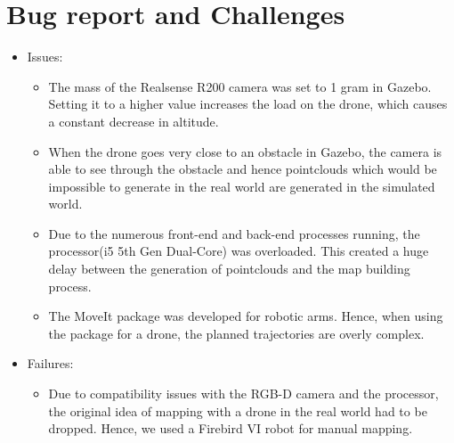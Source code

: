 \documentclass[a4paper,12pt,oneside]{book}
\begin{document}
\section{Bug report and Challenges}
\begin{itemize}
	\item Issues:
		\begin{itemize}
			\item The mass of the Realsense R200 camera was set to 1 gram in Gazebo. Setting it to a higher value increases the load on the drone, which causes a constant decrease in altitude.
			\item When the drone goes very close to an obstacle in Gazebo, the camera is able to see through the obstacle and hence pointclouds which would be impossible to generate in the real world are generated in the simulated world.
			\item Due to the numerous front-end and back-end processes running, the processor(i5 5th Gen Dual-Core) was overloaded. This created a huge delay between the generation of pointclouds and the map building process.
			\item The MoveIt package was developed for robotic arms. Hence, when using the package for a drone, the planned trajectories are overly complex.
		\end{itemize}

	\item Failures:
		\begin{itemize}
			\item Due to compatibility issues with the RGB-D camera and the processor, the original idea of mapping with a drone in the real world had to be dropped. Hence, we used a Firebird VI robot for manual mapping.
		\end{itemize}
		

\end{itemize}
\end{document}
